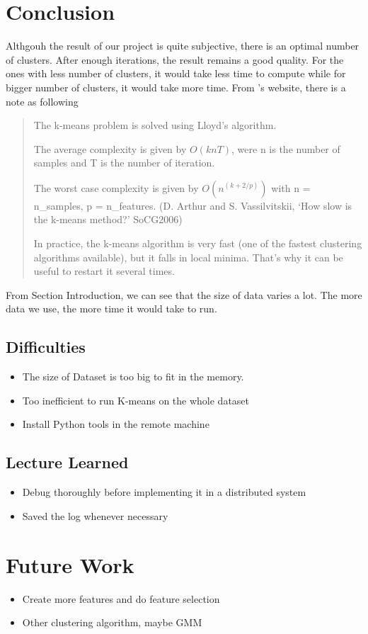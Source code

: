 \section{Conclusion}

Althgouh the result of our project is quite subjective, there is an optimal number of clusters. After enough iterations, the result remains a good quality. For the ones with less number of clusters, it would take less time to compute while for bigger number of clusters, it would take more time. From \cite{sklearn}'s website, there is a note as following
\begin{quote}
The k-means problem is solved using Lloyd’s algorithm.

The average complexity is given by $O(k n T)$, were n is the number of samples and T is the number of iteration.

The worst case complexity is given by $O(n^{(k+2/p)})$ with n = n\_samples, p = n\_features. (D. Arthur and S. Vassilvitskii, `How slow is the k-means method?' SoCG2006)

In practice, the k-means algorithm is very fast (one of the fastest clustering algorithms available), but it falls in local minima. That’s why it can be useful to restart it several times.
\end{quote}

From Section {\color{red}Introduction}, we can see that the size of data varies a lot. The more data we use, the more time it would take to run. 

\subsection{Difficulties}
\begin{itemize}
    \item The size of Dataset is too big to fit in the memory.
    \item Too inefficient to run K-means on the whole dataset
    \item Install Python tools in the remote machine
\end{itemize}

\subsection{Lecture Learned}
\begin{itemize}
    \item Debug thoroughly before implementing it in a distributed system
    \item Saved the log whenever necessary
\end{itemize}

\section{Future Work}
\begin{itemize}
    \item Create more features and do feature selection
    \item Other clustering algorithm, maybe GMM 
\end{itemize}

